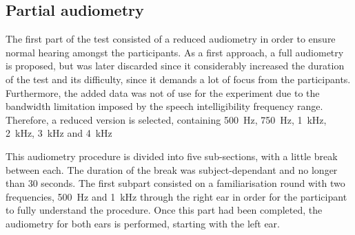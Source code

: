 \subsection{Partial audiometry}
The first part of the test consisted of a reduced audiometry in order to ensure normal hearing amongst the participants. As a first approach, a full audiometry is proposed, but was later discarded since it considerably increased the duration of the test and its difficulty, since it demands a lot of focus from the participants. Furthermore, the added data was not of use for the experiment due to the bandwidth limitation imposed by the speech intelligibility frequency range. Therefore, a reduced version is selected, containing \SI{500}{\hertz}, \SI{750}{\hertz}, \SI{1}{\kilo\hertz}, \SI{2}{\kilo\hertz}, \SI{3}{\kilo\hertz} and \SI{4}{\kilo\hertz}

This audiometry procedure is divided into five sub-sections, with a little break between each. The duration of the break was subject-dependant and no longer than 30 seconds.
The first subpart consisted on a familiarisation round with two frequencies, \SI{500}{\hertz} and \SI{1}{\kilo\hertz} through the right ear in order for the participant to fully understand the procedure. Once this part had been completed, the audiometry for both ears is performed, starting with the left ear.  
   
